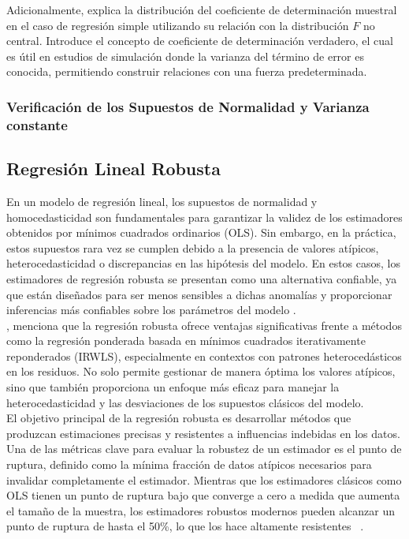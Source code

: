 Adicionalmente, \textcite{christou-2005} explica la distribución del coeficiente de determinación muestral en el caso de regresión simple utilizando su relación con la distribución \(F\) no central. Introduce el concepto de coeficiente de determinación verdadero, el cual es útil en estudios de simulación donde la varianza del término de error es conocida, permitiendo construir relaciones con una fuerza predeterminada.\\



\subsubsection{Verificación de los Supuestos de Normalidad y Varianza constante}




\subsection{Regresión Lineal Robusta}
En un modelo de regresión lineal, los supuestos de normalidad y homocedasticidad son fundamentales para garantizar la validez de los estimadores obtenidos por mínimos cuadrados ordinarios (OLS). Sin embargo, en la práctica, estos supuestos rara vez se cumplen debido a la presencia de valores atípicos, heterocedasticidad o discrepancias en las hipótesis del modelo. En estos casos, los estimadores de regresión robusta se presentan como una alternativa confiable, ya que están diseñados para ser menos sensibles a dichas anomalías y proporcionar inferencias más confiables sobre los parámetros del modelo \parencite{zacarias-2023}.\\

\textcite{annalisa-2024}, menciona que la regresión robusta ofrece ventajas significativas frente a métodos como la regresión ponderada basada en mínimos cuadrados iterativamente reponderados (IRWLS), especialmente en contextos con patrones heterocedásticos en los residuos. No solo permite gestionar de manera óptima los valores atípicos, sino que también proporciona un enfoque más eficaz para manejar la heterocedasticidad y las desviaciones de los supuestos clásicos del modelo.\\


El objetivo principal de la regresión robusta es desarrollar métodos que produzcan estimaciones precisas y resistentes a influencias indebidas en los datos. Una de las métricas clave para evaluar la robustez de un estimador es el punto de ruptura, definido como la mínima fracción de datos atípicos necesarios para invalidar completamente el estimador. Mientras que los estimadores clásicos como OLS tienen un punto de ruptura bajo que converge a cero a medida que aumenta el tamaño de la muestra, los estimadores robustos modernos pueden alcanzar un punto de ruptura de hasta el 50\%, lo que los hace altamente resistentes ~\parencites{siegel-1982,rousseeuw-1984}. \\

